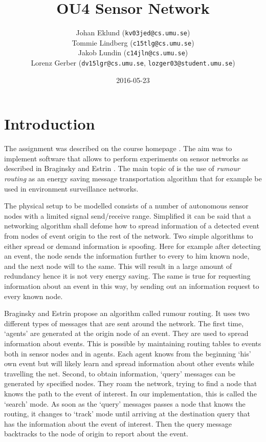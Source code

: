 \documentclass[a4paper,11pt,twoside]{article}
\title{OU4 Sensor Network}
\author{Johan Eklund ({\tt{kv03jed@cs.umu.se}}) \\ 
Tommie Lindberg ({\tt{c15tlg@cs.umu.se}}) \\
Jakob Lundin ({\tt{c14jln@cs.umu.se}}) \\
Lorenz Gerber ({\tt{dv15lgr@cs.umu.se}}, {\tt{lozger03@student.umu.se}})
}
\date{2016-05-23}
\begin{document}
\lstset{language=C}
\maketitle
\thispagestyle{empty}
\newpage
\tableofcontents
\thispagestyle{empty}
\newpage

\clearpage
{}

\section{Introduction} 
The assignment was described on the course homepage
\cite{sensornetwork}. The aim was to implement software that
allows to perform experiments on sensor networks as described in
Braginsky and Estrin \cite{braginsky2002}. The main topic of
\cite{braginsky2002} is the use of \textit{rumour routing} as an
energy saving message transportation algorithm that for example
be used in environment surveillance networks.

The physical setup to be modelled consists of a number of autonomous
sensor nodes with a limited  signal send/receive range. Simplified it
can be said that a networking algorithm shall defome how to spread 
information of a detected event from nodes of event origin to the rest
of the network. Two simple algorithms to either spread or demand
information is spoofing. Here for example after detecting an event,
the node sends the information further to every to him known node, and
the next node will to the same. This will result in a large amount of
redundancy hence it is not very energy saving. The same is true for
requesting information about an event in this way, by sending out an
information request to every known node.

Braginsky and Estrin \cite{braginsky2002} propose an algorithm called
rumour routing. It uses two different types of messages that are sent
around the network. The first time, `agents' are generated at the
origin node of an event. They are used to spread information about
events. This is possible by maintaining routing tables to events both
in sensor nodes and in agents. Each agent knows from the beginning
`his' own event but will likely learn and spread information about
other events while travelling the net. Second, to obtain information,
`query' messages can be generated by specified nodes. They roam the
network, trying to find a node that knows the path to the event of
interest. In our implementation, this is called the `search' mode. As
soon as the `query' messages passes a node that knows the routing,
it changes to `track' mode until arriving at the destination query
that has the information about the event of interest. Then the query
message backtracks to the node of origin to report about the event. 
\end{document}
